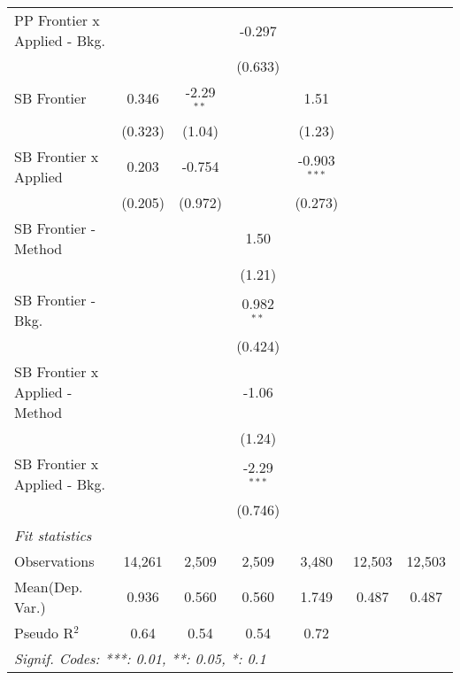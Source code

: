 \begin{tabular}{lcccccc}
   PP Frontier x Applied - Bkg.   &          &              & -0.297        &                &        &   \\   
                                  &          &              & (0.633)       &                &        &   \\   
   SB Frontier                    & 0.346    & -2.29$^{**}$ &               & 1.51           &        &   \\   
                                  & (0.323)  & (1.04)       &               & (1.23)         &        &   \\   
   SB Frontier x Applied          & 0.203    & -0.754       &               & -0.903$^{***}$ &        &   \\   
                                  & (0.205)  & (0.972)      &               & (0.273)        &        &   \\   
   SB Frontier - Method           &          &              & 1.50          &                &        &   \\   
                                  &          &              & (1.21)        &                &        &   \\   
   SB Frontier - Bkg.             &          &              & 0.982$^{**}$  &                &        &   \\   
                                  &          &              & (0.424)       &                &        &   \\   
   SB Frontier x Applied - Method &          &              & -1.06         &                &        &   \\   
                                  &          &              & (1.24)        &                &        &   \\   
   SB Frontier x Applied - Bkg.   &          &              & -2.29$^{***}$ &                &        &   \\   
                                  &          &              & (0.746)       &                &        &   \\   
   \midrule
   \emph{Fit statistics}\\
   Observations                   & 14,261   & 2,509        & 2,509         & 3,480          & 12,503 & 12,503\\  
Mean(Dep. Var.) & 0.936 & 0.560 & 0.560 & 1.749 & 0.487 & 0.487 \\
   Pseudo R$^2$                   & 0.64     & 0.54         & 0.54          & 0.72           &        & \\  
   \midrule \midrule
   \multicolumn{7}{l}{\emph{Signif. Codes: ***: 0.01, **: 0.05, *: 0.1}}\\
\end{tabular}
\par\endgroup

